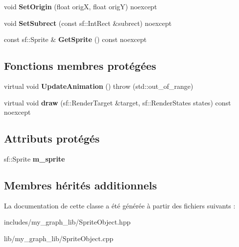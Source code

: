 \begin{DoxyCompactItemize}
\item 
\mbox{\label{classmy_1_1SpriteObject_a828bc053284a62494605a76c53498858}} 
void {\bfseries Set\+Origin} (float origX, float origY) noexcept
\item 
\mbox{\label{classmy_1_1SpriteObject_a0b5ce634af99d1651069cdb0c9c10dbe}} 
void {\bfseries Set\+Subrect} (const sf\+::\+Int\+Rect \&subrect) noexcept
\item 
\mbox{\label{classmy_1_1SpriteObject_a3ce90b6e8a95d73ba346c2b993a74dec}} 
const sf\+::\+Sprite \& {\bfseries Get\+Sprite} () const noexcept
\end{DoxyCompactItemize}
\subsection*{Fonctions membres protégées}
\begin{DoxyCompactItemize}
\item 
\mbox{\label{classmy_1_1SpriteObject_a5ad1c5e9b8ac2b0089f1de5bf616c245}} 
virtual void {\bfseries Update\+Animation} ()  throw (std\+::out\+\_\+of\+\_\+range)
\item 
\mbox{\label{classmy_1_1SpriteObject_a6dbc79fd834894570763f975c5de7920}} 
virtual void {\bfseries draw} (sf\+::\+Render\+Target \&target, sf\+::\+Render\+States states) const noexcept
\end{DoxyCompactItemize}
\subsection*{Attributs protégés}
\begin{DoxyCompactItemize}
\item 
\mbox{\label{classmy_1_1SpriteObject_aede108105767fe39028727a225a24105}} 
sf\+::\+Sprite {\bfseries m\+\_\+sprite}
\end{DoxyCompactItemize}
\subsection*{Membres hérités additionnels}


La documentation de cette classe a été générée à partir des fichiers suivants \+:\begin{DoxyCompactItemize}
\item 
includes/my\+\_\+graph\+\_\+lib/Sprite\+Object.\+hpp\item 
lib/my\+\_\+graph\+\_\+lib/Sprite\+Object.\+cpp\end{DoxyCompactItemize}

